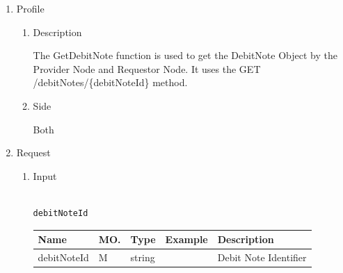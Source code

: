 \begin{enumerate}

\item Profile

\begin{enumerate}

\item Description

The GetDebitNote function is used to get the DebitNote Object by the Provider Node and Requestor Node. 
It uses the GET /debitNotes/\{debitNoteId\} method.
 
\item Side

Both

\end{enumerate}

\item Request

\begin{enumerate}

\item Input

\begin{tcolorbox}[boxrule=0pt, frame empty]
\begin{verbatim}

debitNoteId

\end{verbatim}
\end{tcolorbox}


\begin{table}[H]
\footnotesize

\begin{center}
\begin{tabular}{|p{3cm}|l|p{3cm}|p{3cm}|p{4cm}|} 
\hline
\rowcolor{lightgray}	Name	& MO.	& Type	& Example & 	Description \\
\hline

debitNoteId				& M	& 	string				&								&	Debit Note Identifier \\ 
\hline



\end{tabular}
\end{center}
\end{table}
\end{enumerate}
\end{enumerate}
